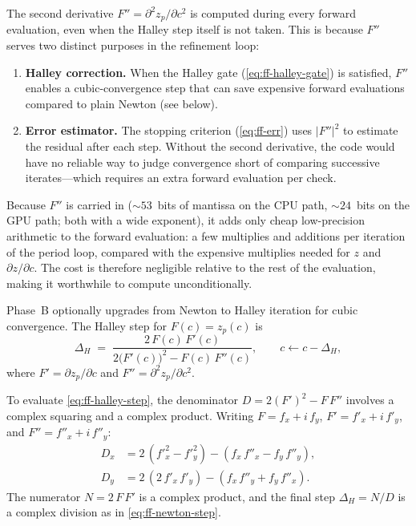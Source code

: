 The second derivative $F'' = \partial^2 z_p/\partial c^2$ is computed during
every forward evaluation, even when the Halley step itself is not taken.  This
is because $F''$ serves two distinct purposes in the refinement loop:

\begin{enumerate}
\item \textbf{Halley correction.}  When the Halley gate (\cref{eq:ff-halley-gate})
  is satisfied, $F''$ enables a cubic-convergence step that can save expensive
  forward evaluations compared to plain Newton (see below).
\item \textbf{Error estimator.}  The stopping criterion
  (\cref{eq:ff-err}) uses $|F''|^2$ to estimate the residual after
  each step.  Without the second derivative, the code would have no reliable
  way to judge convergence short of comparing successive iterates---which
  requires an extra forward evaluation per check.
\end{enumerate}

Because $F''$ is carried in  (${\sim}53$~bits of
mantissa on the CPU path, ${\sim}24$~bits on the GPU path; both with a
wide exponent), it adds only cheap low-precision arithmetic to
the forward evaluation: a few  multiplies and additions per
iteration of the period loop, compared with the expensive 
multiplies needed for $z$ and $\partial z/\partial c$.  The cost is therefore
negligible relative to the rest of the evaluation, making it worthwhile to
compute unconditionally.

Phase~B optionally upgrades from Newton to Halley iteration for cubic
convergence.  The Halley step for $F(c) = z_p(c)$ is
\begin{equation}\label{eq:ff-halley-step}
\Delta_H \;=\;
  \frac{2\,F(c)\,F'(c)}
       {2\bigl(F'(c)\bigr)^2 - F(c)\,F''(c)},
\qquad c \leftarrow c - \Delta_H,
\end{equation}
where $F'=\partial z_p/\partial c$ and $F''=\partial^2 z_p/\partial c^2$.

To evaluate \eqref{eq:ff-halley-step}, the denominator $D = 2(F')^2 - F\,F''$ involves a complex squaring and a
complex product.  Writing $F = f_x + i\,f_y$, $F' = f'_x + i\,f'_y$, and
$F'' = f''_x + i\,f''_y$:
\begin{align}
D_x &= 2\,(f'^2_x - f'^2_y) - (f_x\,f''_x - f_y\,f''_y), \\
D_y &= 2\,(2\,f'_x\,f'_y) - (f_x\,f''_y + f_y\,f''_x).
\end{align}
The numerator $N = 2\,F\,F'$ is a complex product, and the final step
$\Delta_H = N / D$ is a complex division as in \cref{eq:ff-newton-step}.

